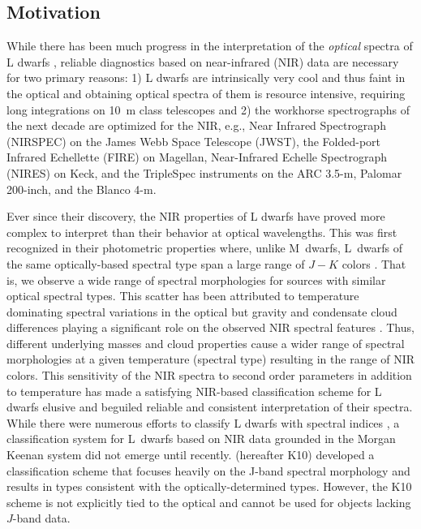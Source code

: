\documentclass[12pt,preprint]{aastex}
\begin{document}
\subsection{Motivation}
While there has been much progress in the interpretation of the \emph{optical} spectra of L dwarfs \citep{K99,Cruz09_lowg}, reliable diagnostics based on near-infrared (NIR) data are necessary for two primary reasons:
1) L dwarfs are intrinsically very cool and thus faint in the optical and obtaining optical spectra of them is resource intensive, requiring long integrations on 10~m class telescopes and 
2) the workhorse spectrographs of the next decade are optimized for the NIR, e.g., Near Infrared Spectrograph (NIRSPEC) on the James Webb Space Telescope (JWST), the Folded-port Infrared Echellette (FIRE) on Magellan, Near-Infrared Echelle Spectrograph (NIRES) on Keck, and the TripleSpec instruments on the ARC 3.5-m, Palomar 200-inch, and the Blanco 4-m.

Ever since their discovery, the NIR properties of L dwarfs have proved more complex to interpret than their behavior at optical wavelengths. 
This was first recognized in their photometric properties where, unlike M~dwarfs, L~dwarfs of the same optically-based spectral type span a large range of $J-K$ colors \citep{Kirkpatrick05}. 
That is, we observe a wide range of spectral morphologies for sources with similar optical spectral types.
This scatter has been attributed to temperature dominating spectral variations in the optical but gravity and condensate cloud differences playing a significant role on the observed NIR spectral features \citep{Knapp04}.
Thus, different underlying masses and cloud properties cause a wider range of spectral morphologies at a given temperature (spectral type) resulting in the range of NIR colors. 
This sensitivity of the NIR spectra to second order parameters in addition to temperature has made a satisfying NIR-based classification scheme for L dwarfs elusive and beguiled reliable and consistent interpretation of their spectra.
While there were numerous efforts to classify L dwarfs with spectral indices \citep{Reid01_NIR, Testi01, Geballe02}, a classification system for L~dwarfs based on NIR data grounded in the Morgan Keenan system did not emerge until recently. \citet{Kirkpatrick10} (hereafter K10) developed a classification scheme that focuses heavily on the J-band spectral morphology and results in types consistent with the optically-determined types. However, the K10 scheme is not explicitly tied to the optical and cannot be used for objects lacking $J$-band data.
\end{document}
